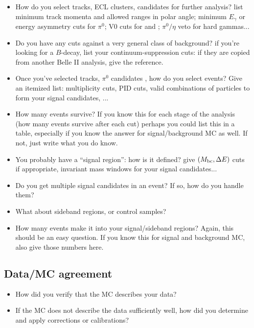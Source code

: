 \begin{itemize}

\item How do you select tracks, ECL clusters, \KS candidates \etc for further analysis?
\eg list minimum track momenta and allowed ranges in polar angle; 
 minimum $E_\gamma$ or energy asymmetry cuts for $\pi^0$; 
 V0 cuts for \KS and \Lz; $\pi^0/\eta$ veto for hard gammas...

\item Do you have any cuts against a very general class of background?
 \eg if you're looking for a $B$-decay,
 list your continuum-suppression cuts:
 if they are copied from another Belle II analysis, give the reference.

\item Once you've selected tracks, $\pi^0$ candidates \etc, how do you select events?
 Give an itemized list:
\eg multiplicity cuts, PID cuts,
 valid combinations of particles
 to form your signal candidates, ...

\item How many events survive?
 If you know this for each stage of the analysis (\ie how many events
 survive after each cut) perhaps you could list this in a table,
 especially if you know the answer for signal/background MC as well.
 If not, just write what you do know.

\item You probably have a ``signal region'': how is it defined?
 \eg give $(M_{\rm bc}, \Delta E)$ cuts if appropriate,
 invariant mass windows for your signal candidates...

\item Do you get multiple signal candidates in an event?	If so, how do you handle them?

\item What about sideband regions, or control samples?

\item How many events make it into your signal/sideband regions?
 Again, this should be an easy question. If you know this for signal
 and background MC, also give those numbers here.

\end{itemize}

\subsection*{Data/MC agreement}

\begin{itemize}

\item How did you verify that the MC describes your data?

\item If the MC does not describe the data sufficiently well, how did you determine and apply corrections or calibrations?

\end{itemize}

